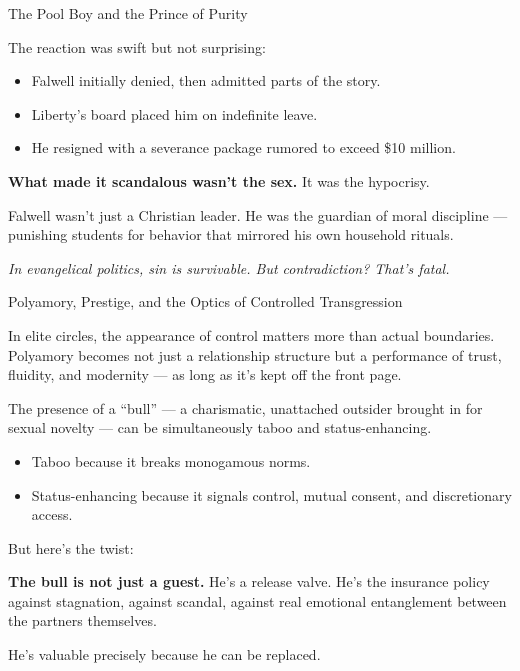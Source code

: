\begin{HistoricalSidebar}{The Pool Boy and the Prince of Purity}
    \medskip
    
    The reaction was swift but not surprising:

    \medskip
    
    \begin{itemize}
      \item Falwell initially denied, then admitted parts of the story.  
      \item Liberty's board placed him on indefinite leave.  
      \item He resigned with a severance package rumored to exceed \$10 million.  
    \end{itemize}

    \medskip
    
    \textbf{What made it scandalous wasn't the sex.}  
    It was the hypocrisy.

    \medskip
    
    Falwell wasn't just a Christian leader.  
    He was the guardian of moral discipline — punishing students for behavior that mirrored his own household rituals.
    
    \medskip
    
    \textit{In evangelical politics, sin is survivable.  
    But contradiction?  
    That's fatal.}

\end{HistoricalSidebar}


\begin{PsychologicalSidebar}{Polyamory, Prestige, and the Optics of Controlled Transgression}

    In elite circles, the appearance of control matters more than actual boundaries.
    Polyamory becomes not just a relationship structure but a performance of trust, fluidity, and modernity — as long as it’s kept off the front page.
    
    The presence of a “bull” — a charismatic, unattached outsider brought in for sexual novelty — can be simultaneously taboo and status-enhancing.
    
    \begin{itemize}
    \item Taboo because it breaks monogamous norms.
    \item Status-enhancing because it signals control, mutual consent, and discretionary access.
    \end{itemize}
    
    But here’s the twist:
    
    \textbf{The bull is not just a guest.}
    He’s a release valve.
    He’s the insurance policy against stagnation, against scandal, against real emotional entanglement between the partners themselves.
    
    He’s valuable precisely because he can be replaced.
    
\end{PsychologicalSidebar}

